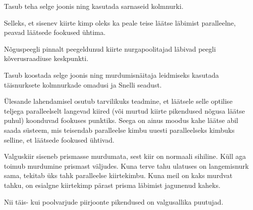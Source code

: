\documentclass[10pt, twoside]{article}
\begin{document}
{
\hint
Tasub teha selge joonis ning kasutada sarnaseid kolmnurki.
\probend
\bigskip


\hint
Selleks, et sisenev kiirte kimp oleks ka peale teise läätse läbimist paralleelne, peavad läätsede fookused ühtima.
\probend
\bigskip


\hint
Nõguspeegli pinnalt peegeldunud kiirte nurgapoolitajad läbivad peegli kõverusraadiuse keskpunkti.
\probend
\bigskip


\hint
Tasub koostada selge joonis ning murdumisnäitaja leidmiseks kasutada täisnurksete kolmnurkade omadusi ja Snelli seadust.
\probend
\bigskip


\hint
Ülesande lahendamisel osutub tarvilikuks teadmine, et läätsele selle optilise teljega paralleelselt langevad kiired (või murtud kiirte pikendused nõgusa läätse puhul) koonduvad fookuses punktiks. Seega on ainus moodus kahe läätse abil saada süsteem, mis teisendab paralleelse kimbu uuesti paralleelseks kimbuks selline, et läätsede fookused ühtivad.
\probend
\bigskip


\hint
Valguskiir siseneb prismasse murdumata, sest kiir on normaali sihiline. Küll aga toimub murdumine prismast väljudes. Kuna terve tahu ulatuses on langemisnurk sama, tekitab üks tahk paralleelse kiirtekimbu. Kuna meil on kaks murdvat tahku, on esialgne kiirtekimp pärast prisma läbimist jagunenud kaheks.
\probend
\bigskip


\hint
Nii täis- kui poolvarjude piirjoonte pikendused on valgusallika puutujad.
\probend
\bigskip

}
\end{document}
